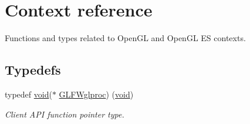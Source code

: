 \hypertarget{group__context}{}\section{Context reference}
\label{group__context}


Functions and types related to Open\+GL and Open\+GL ES contexts.  


\subsection*{Typedefs}
\begin{DoxyCompactItemize}
\item 
typedef \mbox{\hyperlink{glad_8h_a950fc91edb4504f62f1c577bf4727c29}{void}}($\ast$ \mbox{\hyperlink{group__context_ga3d47c2d2fbe0be9c505d0e04e91a133c}{G\+L\+F\+Wglproc}}) (\mbox{\hyperlink{glad_8h_a950fc91edb4504f62f1c577bf4727c29}{void}})
\begin{DoxyCompactList}\small\item\em Client A\+PI function pointer type. \end{DoxyCompactList}\end{DoxyCompactItemize}
